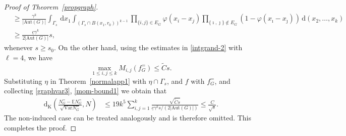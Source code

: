 \documentclass{article}
\theoremstyle{definition}
\numberwithin{equation}{section}
\theoremstyle{remark}
\newcommand{\Var}{\mathrm{Var}}
\begin{document}
\begin{proof}[Proof of Theorem~\ref{propgraph}]
\begin{align}
	&\ge\frac{\gamma^k}{|\mathrm{Aut}(G)|}\int_{\Gamma_s}\,\mathrm{d}x_1\int_{(\Gamma_s\cap B(x_1,r_0))^{k-1}}\prod_{\{i,j\}\in E_G}\varphi(x_i-x_j)\prod_{\{\imath,\jmath\}\notin E_G}(1-\varphi(x_{\imath}-x_{\jmath}))\,\mathrm{d}(x_2,\dots,x_k)\nonumber\\
	&\ge\frac{\underline{c}\gamma^k}{2|\mathrm{Aut}(G)|}s,\label{graphvar3}
\end{align} 
whenever $s\ge s_0$. 
On the other hand, using the estimates in \eqref{intgrand-2} with $\ell=4$, we have
\begin{equation}\label{mom-bound1}
	\max_{1\le i,j\le k}M_{i,j}(f^{=}_G)\le \tilde{C}s.
\end{equation}
Substituting $\eta$ in Theorem~\ref{normalapp1} with $\eta\cap\Gamma_s$, and $f$ with $f_G^{=}$, and collecting \eqref{graphvar3}, \eqref{mom-bound1} we obtain that
\begin{align}
	\mathrm{d}_{\mathrm{K}}\left(\frac{N_G^{=}-\mathbb{E} N_G^{=}}{\sqrt{\Var N_G^{=}}},N\right)&\le 19k^5\sum_{i,j=1}^k\frac{\sqrt{\tilde{C}s}}{\underline{c}\gamma^{k}s/(2|\mathrm{Aut}(G)|)}\le \frac{C}{\sqrt{s}}. 
\end{align}
The non-induced case can be treated analogously and is therefore omitted. This completes the proof.
\end{proof}
\end{document}
